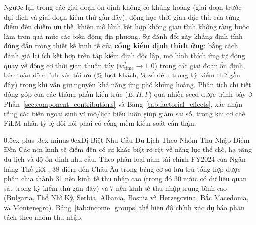 \documentclass[10pt,journal,compsoc]{IEEEtran}
\makeatletter
\def\subsection{\@startsection{subsection}{2}{\z@}{-1.8ex plus -0.6ex minus -0.3ex}%
{0.5ex plus .3ex minus 0ex}{\normalfont\normalsize\rmfamily\bfseries}}
\makeatother
\begin{document}
Ngược lại, trong các giai đoạn ổn định không có khủng hoảng (giai đoạn trước đại dịch và giai đoạn kiểm thử gần đây), động học thời gian đặc thù của từng điểm đến chiếm ưu thế, khiến mô hình kết hợp không gian tĩnh không ràng buộc làm trơn quá mức các biến động địa phương. Sự đánh đổi này khẳng định tính đúng đắn trong thiết kế kinh tế của \textbf{cổng kiểm định thích ứng}: bằng cách đánh giá lợi ích kết hợp trên tập kiểm định độc lập, mô hình thích ứng tự động quay về động cơ thời gian thuần túy ($w_{\text{time}}^* \to 1{,}0$) trong các giai đoạn ổn định, bảo toàn độ chính xác tối ưu (\ReviewerArrivalWAPE{}\% lượt khách, \ReviewerNightsWAPE{}\% số đêm trong kỳ kiểm thử gần đây) trong khi vẫn giữ nguyên khả năng ứng phó khủng hoảng. Phân tích chi tiết đóng góp của các thành phần kiến trúc ($E, H, F$) qua nhiều seed được trình bày ở Phần~\ref{sec:component_contributions} và Bảng~\ref{tab:factorial_effects}, xác nhận rằng các biến ngoại sinh vĩ mô/lịch biểu luôn giúp giảm sai số, trong khi cơ chế FiLM nhân tỷ lệ đòi hỏi phải có cổng mềm kiểm soát cẩn thận.

\subsection{Dị Biệt Nhu Cầu Du Lịch Theo Nhóm Thu Nhập Điểm Đến}
\label{sec:income_heterogeneity}
Các nền kinh tế điểm đến có sự khác biệt rõ rệt về năng lực thể chế, hạ tầng du lịch và độ ổn định nhu cầu. Theo phân loại năm tài chính FY2024 của Ngân hàng Thế giới \cite{worldbank_income_fy24,income_fy24_table}, 38 điểm đến Châu Âu trong bảng cơ sở lưu trú tổng hợp được phân chia thành 31 nền kinh tế thu nhập cao (trong đó 30 nước có dữ liệu quan sát trong kỳ kiểm thử gần đây) và 7 nền kinh tế thu nhập trung bình cao (Bulgaria, Thổ Nhĩ Kỳ, Serbia, Albania, Bosnia và Herzegovina, Bắc Macedonia, và Montenegro). Bảng~\ref{tab:income_groups} thể hiện độ chính xác dự báo phân tách theo nhóm thu nhập.


\end{document}
